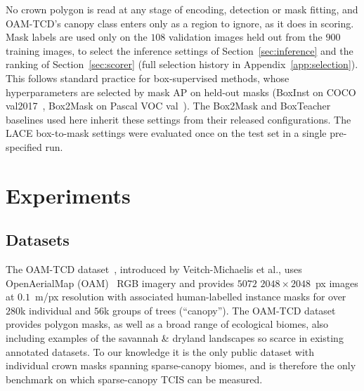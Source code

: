 \documentclass[remotesensing,article,submit,moreauthors]{Definitions/mdpi}
\begin{document}
No crown polygon is read at any stage of encoding, detection or mask fitting, and OAM-TCD's canopy class enters only as a region to ignore, as it does in scoring. Mask labels are used only on the $108$ validation images held out from the $900$ training images, to select the inference settings of Section~\ref{sec:inference} and the ranking of Section~\ref{sec:scorer} (full selection history in Appendix~\ref{app:selection}). This follows standard practice for box-supervised methods, whose hyperparameters are selected by mask AP on held-out masks (BoxInst on COCO val2017~\cite{boxinst}, Box2Mask on Pascal VOC val~\cite{box2mask}). The Box2Mask and BoxTeacher baselines used here inherit these settings from their released configurations. The LACE box-to-mask settings were evaluated once on the test set in a single pre-specified run.

\section{Experiments}

\subsection{Datasets}


The OAM-TCD dataset~\cite{oamtcd}, introduced by Veitch-Michaelis et al., uses OpenAerialMap (OAM)~\cite{oam} RGB imagery and provides $5072$ $2048\times2048$~px images at $0.1$~m/px resolution with associated human-labelled instance masks for over $280$k individual and $56$k groups of trees (``canopy''). The OAM-TCD dataset provides polygon masks, as well as a broad range of ecological biomes, also including examples of the savannah \& dryland landscapes so scarce in existing annotated datasets. To our knowledge it is the only public dataset with individual crown masks spanning sparse-canopy biomes, and is therefore the only benchmark on which sparse-canopy TCIS can be measured.
\end{document}
